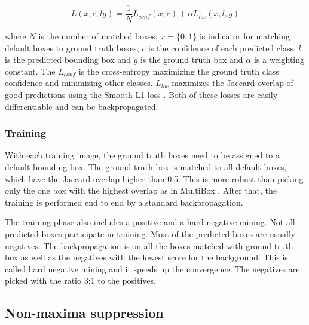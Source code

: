\documentclass[a4paper,11pt,titlepage,twoside]{article}
\numberwithin{figure}{section}
\begin{document}
\begin{equation}
L(x, c, l g) = \frac{1}{N}L_{conf}(x, c) + \alpha L_{loc}(x, l, g)
\end{equation}

where $N$ is the number of matched boxes, $x = \{0, 1\}$ is indicator for matching default boxes to ground truth boxes, $c$ is the confidence of each predicted class, $l$ is the predicted bounding box and $g$ is the ground truth box and $\alpha$ is a weighting constant. The $L_{conf}$ is the cross-entropy maximizing the ground truth class confidence and minimizing other classes. $L_{loc}$ maximizes the Jaccard overlap of good predictions using the Smooth L1 loss \cite{girshick2015fast}. Both of these losses are easily differentiable and can be backpropagated. 
 

\subsubsection{Training}
With each training image, the ground truth boxes need to be assigned to a default bounding box. The ground truth box is matched to all default boxes, which have the Jaccard overlap higher than 0.5. This is more robust than picking only the one box with the highest overlap as in MultiBox \cite{erhan2014scalable}. After that, the training is performed end to end by a standard backpropagation. 

The training phase also includes a positive and a hard negative mining. Not all predicted boxes participate in training. Most of the predicted boxes are usually negatives. The backpropagation is on all the boxes matched with ground truth box as well as the negatives with the lowest score for the background. This is called hard negative mining and it speeds up the convergence. The negatives are picked with the ratio 3:1 to the positives.

\subsection{Non-maxima suppression}
\end{document}
